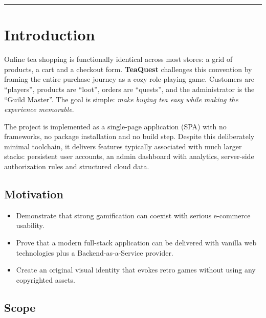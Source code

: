 \documentclass[11pt,a4paper]{article}
\begin{document}
\vspace{0.5cm}
{\color{teadark!30}\hrule}
\vspace{0.5cm}

\tableofcontents
\newpage


\section{Introduction}

Online tea shopping is functionally identical across most stores: a grid of
products, a cart and a checkout form. \textbf{TeaQuest} challenges this
convention by framing the entire purchase journey as a cozy role-playing
game. Customers are ``players'', products are ``loot'', orders are
``quests'', and the administrator is the ``Guild Master''. The goal is
simple: \emph{make buying tea easy while making the experience memorable}.

The project is implemented as a single-page application (SPA) with no
frameworks, no package installation and no build step. Despite this
deliberately minimal toolchain, it delivers features typically associated
with much larger stacks: persistent user accounts, an admin dashboard with
analytics, server-side authorization rules and structured cloud data.

\subsection{Motivation}

\begin{itemize}[nosep]
    \item Demonstrate that strong gamification can coexist with serious
          e-commerce usability.
    \item Prove that a modern full-stack application can be delivered with
          vanilla web technologies plus a Backend-as-a-Service provider.
    \item Create an original visual identity that evokes retro games without
          using any copyrighted assets.
\end{itemize}

\subsection{Scope}
\end{document}
